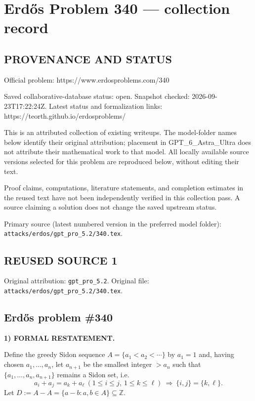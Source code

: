 \section*{Erd\H{o}s Problem 340 --- collection record}

\subsection*{PROVENANCE AND STATUS}
Official problem: https://www.erdosproblems.com/340

Saved collaborative-database status: open.
Snapshot checked: 2026-09-23T17:22:24Z.
Latest status and formalization links: https://teorth.github.io/erdosproblems/

This is an attributed collection of existing writeups. The model-folder names below identify their original attribution; placement in GPT\_6\_Astra\_Ultra does not attribute their mathematical work to that model. All locally available source versions selected for this problem are reproduced below, without editing their text.

Proof claims, computations, literature statements, and completion estimates in the reused text have not been independently verified in this collection pass. A source claiming a solution does not change the saved upstream status.

Primary source (latest numbered version in the preferred model folder): \texttt{attacks/erdos/gpt\_pro\_5.2/340.tex}.

\subsection*{REUSED SOURCE 1}
Original attribution: \texttt{gpt\_pro\_5.2}.
Original file: \texttt{attacks/erdos/gpt\_pro\_5.2/340.tex}.

\subsection*{Erd\H{o}s problem \#340}

\noindent\textbf{1) FORMAL RESTATEMENT.}

Define the greedy Sidon sequence $A=\{a_1<a_2<\cdots\}$ by $a_1=1$ and, having chosen $a_1,\dots,a_n$, let $a_{n+1}$ be the smallest integer $>a_n$ such that $\{a_1,\dots,a_n,a_{n+1}\}$ remains a Sidon set, i.e.
\[
 a_i+a_j=a_k+a_\ell\ (1\le i\le j,\ 1\le k\le \ell)\ \Rightarrow\ \{i,j\}=\{k,\ell\}.
\]
Let $D:=A-A=\{a-b: a,b\in A\}\subseteq\mathbb{Z}$.

